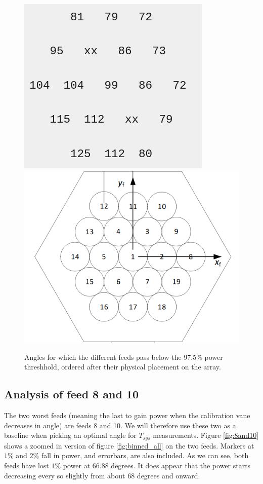 \documentclass[10pt, a4paper]{article}
\begin{document}
\vspace{1cm}
\begin{figure}[h!]
    \centering
    \includegraphics[scale=0.5]{../plots/vane_nums1.png}
    \includegraphics[scale=0.4]{../plots/vane_nums2.png}
    \caption{Angles for which the different feeds pass below the 97.5\% power threshhold, ordered after their physical placement on the array.}
    \label{fig:layout}
\end{figure}


\pagebreak


\subsection{Analysis of feed 8 and 10}
The two worst feeds (meaning the last to gain power when the calibration vane decreases in angle) are feeds 8 and 10. We will therefore use these two as a baseline when picking an optimal angle for $T_{sys}$ measurements. Figure \ref{fig:8and10} shows a zoomed in version of figure \ref{fig:binned_all} on the two feeds. Markers at $1\%$ and $2\%$ fall in power, and errorbars, are also included. As we can see, both feeds have lost $1\%$ power at $66.88$ degrees. It does appear that the power starts decreasing every so slightly from about $68$ degrees and onward.
\end{document}
